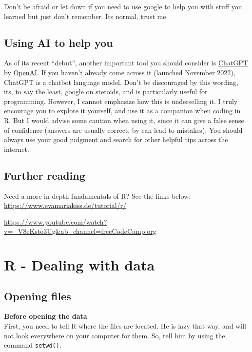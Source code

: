 \documentclass[
]{book}
\begin{document}
Don't be afraid or let down if you need to use google to help you with stuff you learned but just don't remember.
Its normal, trust me.

\hypertarget{using-ai-to-help-you}{%
\section{Using AI to help you}\label{using-ai-to-help-you}}

As of its recent ``debut'', another important tool you should consider is \href{https://openai.com/blog/chatgpt/}{ChatGPT} by \href{https://openai.com}{OpenAI}.
If you haven't already come across it (launched November 2022), ChatGPT is a chatbot language model.
Don't be discouraged by this wording, its, to say the least, google on steroids, and is particularly useful for programming.
However, I cannot emphasize how this is underselling it.
I truly encourage you to explore it yourself, and use it as a companion when coding in R.
But I would advise some caution when using it, since it can give a false sense of confidence (answers are usually correct, by can lead to mistakes).
You should always use your good judgment and search for other helpful tips across the internet.

\hypertarget{further-reading}{%
\section{Further reading}\label{further-reading}}

Need a more in-depth fundamentals of R?
See the links below:\\
\url{https://www.evamariakiss.de/tutorial/r/}

\url{https://www.youtube.com/watch?v=_V8eKsto3Ug\&ab_channel=freeCodeCamp.org}

\hypertarget{r---dealing-with-data}{%
\chapter{R - Dealing with data}\label{r---dealing-with-data}}

\hypertarget{opening-files}{%
\section{Opening files}\label{opening-files}}

\textbf{Before opening the data}\\
First, you need to tell R where the files are located.
He is lazy that way, and will not look everywhere on your computer for them.
So, tell him by using the command \texttt{setwd()}.
\end{document}
